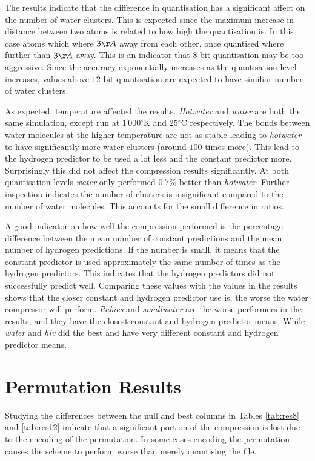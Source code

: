 \documentclass[a4paper]{report}
\newcommand{\degree}{\ensuremath{^\circ}}
\begin{document}
The results indicate that the difference in quantisation has a significant
affect on the number of water clusters. This is expected since the maximum
increase in distance between two atoms is related to how high the quantisation
is. In this case atoms which where $3 \AA$ away from each other, once
quantised where further than $3 \AA$ away. This is an indicator that $8$-bit
quantisation may be too aggressive. Since the accuracy exponentially increases
as the quantisation level increases, values above $12$-bit quantisation are
expected to have similiar number of water clusters.

As expected, temperature affected the results. \emph{Hotwater} and
\emph{water} are both the same simulation, except run at $1\,000\degree$K and
$25\degree$C respectively. The bonds between water molecules at the higher
temperature are not as stable leading to \emph{hotwater} to have significantly
more water clusters (around $100$ times more). This lead to the hydrogen
predictor to be used a lot less and the constant predictor more. Surprisingly
this did not affect the compression results significantly. At both
quantisation levels \emph{water} only performed $0.7\%$ better than
\emph{hotwater}. Further inspection indicates the number of clusters is
insignificant compared to the number of water molecules. This accounts for the
small difference in ratios.

A good indicator on how well the compression performed is the percentage
difference between the mean number of constant predictions and the mean number
of hydrogen predictions. If the number is small, it means that the constant
predictor is used approximately the same number of times as the hydrogen
predictors. This indicates that the hydrogen predictors did not successfully
predict well. Comparing these values with the values in the results shows that
the closer constant and hydrogen predictor use is, the worse the water
compressor will perform. \emph{Rabies} and \emph{smallwater} are the worse
performers in the results, and they have the closest constant and hydrogen
predictor means. While \emph{water} and \emph{hiv} did the best and have very
different constant and hydrogen predictor means.



\section{Permutation Results}

Studying the differences between the null and best columns in Tables
\ref{tab:res8} and \ref{tab:res12} indicate that a significant portion of the
compression is lost due to the encoding of the permutation. In some cases
encoding the permutation causes the scheme to perform worse than merely
quantising the file.
\end{document}
